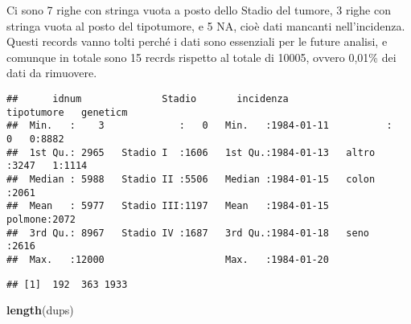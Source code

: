 \documentclass[]{article}
\newenvironment{Shaded}{\begin{snugshade}}{\end{snugshade}}
\newcommand{\KeywordTok}[1]{\textcolor[rgb]{0.13,0.29,0.53}{\textbf{#1}}}
\newcommand{\NormalTok}[1]{#1}
\newcommand{\OperatorTok}[1]{\textcolor[rgb]{0.81,0.36,0.00}{\textbf{#1}}}
\newcommand{\StringTok}[1]{\textcolor[rgb]{0.31,0.60,0.02}{#1}}
\begin{document}
Ci sono 7 righe con stringa vuota a posto dello Stadio del tumore, 3
righe con stringa vuota al posto del tipotumore, e 5 NA, cioè dati
mancanti nell'incidenza. Questi records vanno tolti perché i dati sono
essenziali per le future analisi, e comunque in totale sono 15 recrds
rispetto al totale di 10005, ovvero 0,01\% dei dati da rimuovere.

\begin{Shaded}
\end{Shaded}

\begin{verbatim}
##      idnum              Stadio       incidenza            tipotumore   geneticm
##  Min.   :    3             :   0   Min.   :1984-01-11          :   0   0:8882  
##  1st Qu.: 2965   Stadio I  :1606   1st Qu.:1984-01-13   altro  :3247   1:1114  
##  Median : 5988   Stadio II :5506   Median :1984-01-15   colon  :2061           
##  Mean   : 5977   Stadio III:1197   Mean   :1984-01-15   polmone:2072           
##  3rd Qu.: 8967   Stadio IV :1687   3rd Qu.:1984-01-18   seno   :2616           
##  Max.   :12000                     Max.   :1984-01-20
\end{verbatim}

\begin{Shaded}
\end{Shaded}

\begin{verbatim}
## [1]  192  363 1933
\end{verbatim}

\begin{Shaded}
\begin{Highlighting}[]
\KeywordTok{length}\NormalTok{(dups)}
\end{Highlighting}
\end{Shaded}
\end{document}
